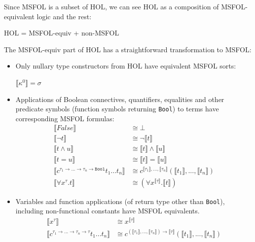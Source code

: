 \documentclass{article}
\begin{document}
	Since MSFOL is a subset of 
	HOL, we can see HOL as a 
	composition of 
	MSFOL-equivalent logic 
	and the rest:
	\begin{center}
		HOL = MSFOL-equiv + non-MSFOL 
	\end{center}
	The MSFOL-equiv part of HOL has 
	a straightforward transformation 
	to MSFOL:
	\begin{itemize}
		\item Only nullary type 
		constructors from HOL have
		equivalent MSFOL sorts:
		\begin{center}
			$\llbracket \kappa^{0} 
			\rrbracket = \sigma $
		\end{center}
		\item Applications of 
		Boolean connectives,
		quantifiers, equalities and 
		other predicate symbols (function symbols 
		returning \texttt{Bool}) to 
		terms have corresponding 
		MSFOL formulas:
		\begin{align*}
		\llbracket False 
		\rrbracket &\cong \bot \\
		\llbracket \neg t \rrbracket 
		&\cong \neg \llbracket t 
		\rrbracket\\
		\llbracket t \land u 
		\rrbracket &\cong \llbracket t 
		\rrbracket \land \llbracket u
		\rrbracket\\
		\llbracket t = u \rrbracket 
		&\cong \llbracket t 
		\rrbracket = \llbracket u
		\rrbracket\\
		\llbracket c^{\tau_1 \to ... 
			\to \tau_n \to \texttt{Bool}} 
		t_1 ... t_n \rrbracket &\cong 
		c^{\llbracket \tau_1 \rrbracket, 
			..., \llbracket \tau_n \rrbracket}
		(\llbracket t_1 \rrbracket, ..., 
		\llbracket t_n \rrbracket)\\
		\llbracket \forall x^{\tau}.t 
		\rrbracket &\cong (\forall 
		x^{\llbracket \tau \rrbracket}.
		\llbracket t \rrbracket)
		\end{align*}
		\item Variables and function 
		applications (of return type 
		other than \texttt{Bool}), 
		including non-functional 
		constants have MSFOL 
		equivalents.
		\begin{align*}
		\llbracket x^{\tau} 
		\rrbracket &\cong 
		x^{\llbracket \tau \rrbracket}\\
		\llbracket c^{\tau_1 \to ... 
			\to \tau_n \to \tau} 
		t_1 ... t_n \rrbracket &\cong 
		c^{(\llbracket \tau_1 \rrbracket, 
			..., \llbracket \tau_n \rrbracket)
			\to \llbracket \tau \rrbracket}
		(\llbracket t_1 \rrbracket, ..., 
		\llbracket t_n \rrbracket)
		\end{align*}
	\end{itemize}
	
\end{document}
